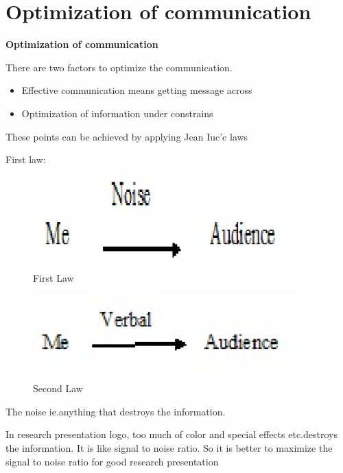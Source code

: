 \chapter{\textbf{Optimization of communication}}



\textbf{Optimization of communication}

There are two factors to optimize the communication.\cite {Anna and Bob}

\begin{itemize}
  \item Effective communication means getting message across
  \item Optimization of information under constrains
\end{itemize}



These points can be achieved by applying Jean Iuc'c laws

First law:

\begin{figure}
  \includegraphics[width=4in]{law1.eps} 
  \caption {First Law}\label{2.1}  
\end{figure}

\begin{figure}
  \includegraphics[width=4in]{law2.eps}
  \caption {Second Law}\label{2.2}
\end{figure}





The noise ie.anything that destroys the information.

In research presentation logo, too much of color and special effects etc.destroys the information.
It is like signal to noise ratio. So it is better to maximize the signal to noise ratio for good research presentation

